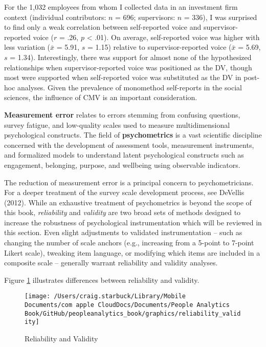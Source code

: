 \documentclass[
]{book}
\begin{document}
For the 1,032 employees from whom I collected data in an investment firm context (individual contributors: \(n\) = 696; supervisors: \(n\) = 336), I was surprised to find only a weak correlation between self-reported voice and supervisor-reported voice (\(r\) = .26, \(p\) \textless{} .01). On average, self-reported voice was higher with less variation (\(\bar{x}\) = 5.91, \(s\) = 1.15) relative to supervisor-reported voice (\(\bar{x}\) = 5.69, \(s\) = 1.34). Interestingly, there was support for almost none of the hypothesized relationships when supervisor-reported voice was positioned as the DV, though most were supported when self-reported voice was substituted as the DV in post-hoc analyses. Given the prevalence of monomethod self-reports in the social sciences, the influence of CMV is an important consideration.

\textbf{Measurement error} relates to errors stemming from confusing questions, survey fatigue, and low-quality scales used to measure multidimensional psychological constructs. The field of \textbf{psychometrics} is a vast scientific discipline concerned with the development of assessment tools, measurement instruments, and formalized models to understand latent psychological constructs such as engagement, belonging, purpose, and wellbeing using observable indicators.

The reduction of measurement error is a principal concern to psychometricians. For a deeper treatment of the survey scale development process, see DeVellis (2012). While an exhaustive treatment of psychometrics is beyond the scope of this book, \emph{reliability} and \emph{validity} are two broad sets of methods designed to increase the robustness of psychological instrumentation which will be reviewed in this section. Even slight adjustments to validated instrumentation -- such as changing the number of scale anchors (e.g., increasing from a 5-point to 7-point Likert scale), tweaking item language, or modifying which items are included in a composite scale -- generally warrant reliability and validity analyses.

Figure \ref{fig:reli-vali} illustrates differences between reliability and validity.

\begin{figure}

{\centering \texttt{[image: /Users/craig.starbuck/Library/Mobile Documents/com~apple~CloudDocs/Documents/People Analytics Book/GitHub/peopleanalytics\_book/graphics/reliability\_validity]} 

}

\caption{Reliability and Validity}\label{fig:reli-vali}
\end{figure}
\end{document}
